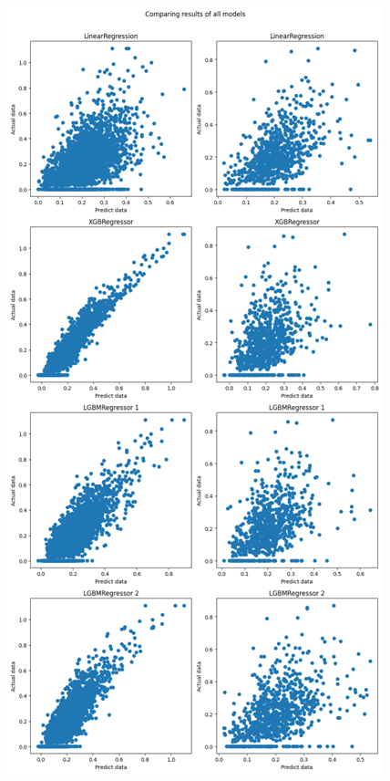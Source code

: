 \documentclass{article}
\begin{document}
\begin{figure}[H]
  \centering
  \begin{minipage}[b]{0.5\textwidth}
    \centering
    \includegraphics[width=\textwidth]{all_models_1.png}

\end{minipage}
\end{figure}
\end{document}
